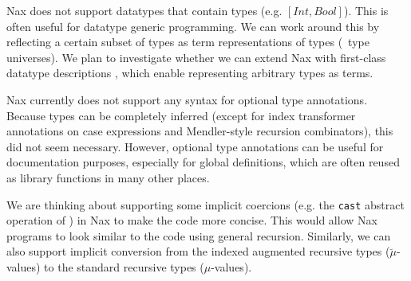 Nax does not support datatypes that contain types (e.g. $[Int,Bool]$).
This is often useful for datatype generic programming. We can work around
this by reflecting a certain subset of types as term representations of types
(\aka\ type universes). We plan to investigate whether we can extend Nax with
first-class datatype descriptions \cite{DagMcb12}, which
enable representing arbitrary types as terms.

Nax currently does not support any syntax for optional type annotations.
Because types can be completely inferred (except for index transformer
annotations on case expressions and Mendler-style recursion combinators), this
did not seem necessary.
However, optional type annotations can be useful for documentation purposes,
especially for global definitions, which are often reused as library functions
in many other places.

We are thinking about supporting some implicit coercions (e.g. the {\tt cast}
abstract operation of \MPr) in Nax to make the code more concise.
This would allow Nax programs to look similar
to the code using general recursion.  Similarly,
we can also support implicit conversion from the indexed augmented
recursive types ($\breve{\mu}$-values) to the standard recursive types
($\mu$-values).

